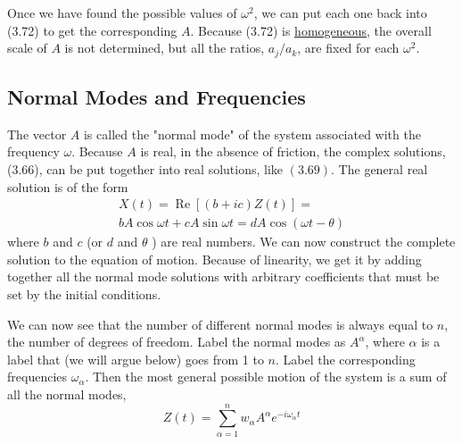 \documentclass[main.tex]{subfiles}
\begin{document}
Once we have found the possible values of $\omega^2$, we can put each one back into (3.72) to get the corresponding $A$. Because (3.72) is \hyperlink{homogeneous}{homogeneous}, the overall scale of $A$ is not determined, but all the ratios, $a_j / a_k$, are fixed for each $\omega^2$.

\subsection{Normal Modes and Frequencies}
The vector $A$ is called the "normal mode" of the system associated with the frequency $\omega$. Because $A$ is real, in the absence of friction, the complex solutions, (3.66), can be put together into real solutions, like $(3.69)$. The general real solution is of the form
$$
\begin{gathered}
X(t)=\operatorname{Re}[(b+i c) Z(t)]= \\
b A \cos \omega t+c A \sin \omega t=d A \cos (\omega t-\theta)
\end{gathered}
$$
where $b$ and $c$ (or $d$ and $\theta$ ) are real numbers.
We can now construct the complete solution to the equation of motion. Because of linearity, we get it by adding together all the normal mode solutions with arbitrary coefficients that must be set by the initial conditions.

We can now see that the number of different normal modes is always equal to $n$, the number of degrees of freedom. Label the normal modes as $A^\alpha$, where $\alpha$ is a label that (we will argue below) goes from 1 to $n$. Label the corresponding frequencies $\omega_\alpha$. Then the most general possible motion of the system is a sum of all the normal modes,
$$
Z(t)=\sum_{\alpha=1}^n w_\alpha A^\alpha e^{-i \omega_\alpha t}
$$
\end{document}
